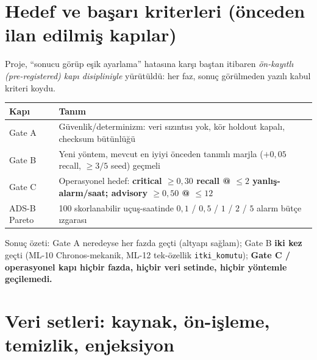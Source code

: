 \documentclass[11pt,a4paper]{article}
\newcommand{\code}[1]{\texttt{\small #1}}
\newcommand{\gatefail}[1]{\textcolor{failred}{\textbf{#1}}}
\begin{document}
\section{Hedef ve başarı kriterleri (önceden ilan edilmiş kapılar)}

Proje, ``sonucu görüp eşik ayarlama'' hatasına karşı baştan itibaren
\emph{ön-kayıtlı (pre-registered) kapı disipliniyle} yürütüldü: her faz, sonuç
görülmeden yazılı kabul kriteri koydu.

\begin{table}[h!]
\centering\small
\begin{tabularx}{\textwidth}{lL}
\toprule
\textbf{Kapı} & \textbf{Tanım} \\
\midrule
Gate A & Güvenlik/determinizm: veri sızıntısı yok, kör holdout kapalı, checksum bütünlüğü \\
Gate B & Yeni yöntem, mevcut en iyiyi önceden tanımlı marjla ($+0{,}05$ recall, $\geq 3/5$ seed) geçmeli \\
Gate C & Operasyonel hedef: \textbf{critical $\geq 0{,}30$ recall @ $\leq 2$ yanlış-alarm/saat; advisory $\geq 0{,}50$ @ $\leq 12$} \\
ADS-B Pareto & 100 skorlanabilir uçuş-saatinde $0{,}1$ / $0{,}5$ / $1$ / $2$ / $5$ alarm bütçe ızgarası \\
\bottomrule
\end{tabularx}
\end{table}

Sonuç özeti: Gate A neredeyse her fazda geçti (altyapı sağlam); Gate B \textbf{iki
kez} geçti (ML-10 Chronos-mekanik, ML-12 tek-özellik \code{itki\_komutu});
\gatefail{Gate C / operasyonel kapı hiçbir fazda, hiçbir veri setinde, hiçbir
yöntemle geçilemedi.}

\section{Veri setleri: kaynak, ön-işleme, temizlik, enjeksiyon}
\end{document}
